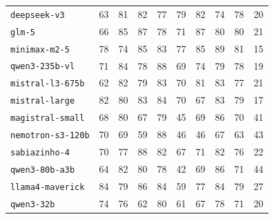 \documentclass{IOS-Book-Article}
\begin{document}
\begin{table}[!ht]
\begin{tabular}{llrrrrrrrr}
\texttt{deepseek-v3} & 63 & 81 & 82 & 77 & 79 & 82 & 74 & 78 & 20 \\
\texttt{glm-5} & 66 & 85 & 87 & 78 & 71 & 87 & 80 & 80 & 21 \\
\texttt{minimax-m2-5} & 78 & 74 & 85 & 83 & 77 & 85 & 89 & 81 & 15 \\
\texttt{qwen3-235b-vl} & 71 & 84 & 78 & 88 & 69 & 74 & 79 & 78 & 19 \\
\texttt{mistral-l3-675b} & 62 & 82 & 79 & 83 & 70 & 81 & 83 & 77 & 21 \\
\texttt{mistral-large} & 82 & 80 & 83 & 84 & 70 & 67 & 83 & 79 & 17 \\
\texttt{magistral-small} & 68 & 80 & 67 & 79 & 45 & 69 & 86 & 70 & 41 \\
\texttt{nemotron-s3-120b} & 70 & 69 & 59 & 88 & 46 & 46 & 67 & 63 & 43 \\
\texttt{sabiazinho-4} & 70 & 77 & 88 & 82 & 67 & 71 & 82 & 76 & 22 \\
\texttt{qwen3-80b-a3b} & 64 & 82 & 80 & 78 & 42 & 69 & 86 & 71 & 44 \\
\texttt{llama4-maverick} & 84 & 79 & 86 & 84 & 59 & 77 & 84 & 79 & 27 \\
\texttt{qwen3-32b} & 74 & 76 & 62 & 80 & 61 & 67 & 78 & 71 & 20 \\
\hline
\end{tabular}
\end{table}
\end{document}
